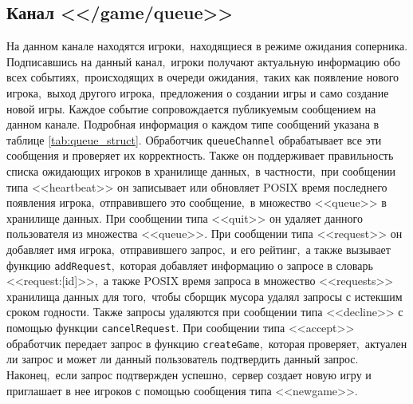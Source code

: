 \documentclass[14pt,a4paper]{report}
\begin{document}
\subsection{Канал <</game/queue>>}
На данном канале находятся игроки,~находящиеся в режиме ожидания соперника. Подписавшись на данный канал,~игроки получают актуальную информацию обо всех событиях,~происходящих в очереди ожидания,~таких как появление нового игрока,~выход другого игрока,~предложения о создании игры и само создание новой игры. Каждое событие сопровождается публикуемым сообщением на данном канале. Подробная информация о каждом типе сообщений указана в таблице \ref{tab:queue_struct}. Обработчик \lstinline$queueChannel$ обрабатывает все эти сообщения и проверяет их корректность. Также он поддерживает правильность списка ожидающих игроков в хранилище данных,~в частности,~при сообщении типа <<heartbeat>> он записывает или обновляет POSIX время последнего появления игрока,~отправившего это сообщение,~в множество <<queue>> в хранилище данных. При сообщении типа <<quit>> он удаляет данного пользователя из множества <<queue>>. При сообщении типа <<request>> он добавляет имя игрока,~отправившего запрос,~и его рейтинг,~а также вызывает функцию \lstinline$addRequest$,~которая добавляет информацию о запросе в словарь <<request:[id]>>,~а также POSIX время запроса в множество <<requests>> хранилища данных для того,~чтобы сборщик мусора удалял запросы с истекшим сроком годности. Также запросы удаляются при сообщении типа <<decline>> с помощью функции \lstinline$cancelRequest$. При сообщении типа <<accept>> обработчик передает запрос в функцию \lstinline$createGame$,~которая проверяет,~актуален ли запрос и может ли данный пользователь подтвердить данный запрос. Наконец,~если запрос подтвержден успешно,~сервер создает новую игру и приглашает в нее игроков с помощью сообщения типа <<newgame>>.
\end{document}
